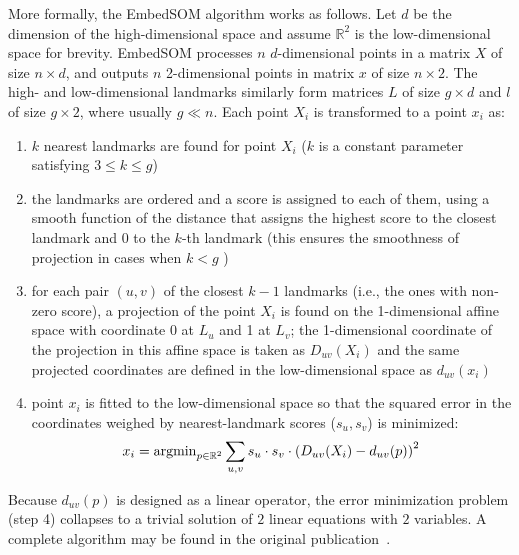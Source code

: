More formally, the EmbedSOM algorithm works as follows. Let $d$ be the dimension of the high-dimensional space and assume $\mathbb{R}^2$ is the low-dimensional space for brevity. EmbedSOM processes $n$ $d$-dimensional points in a matrix $X$ of size $n\times d$, and outputs $n$ 2-dimensional points in matrix $x$ of size $n\times 2$.
The high- and low-dimensional landmarks similarly form matrices $L$ of size $g\times d$ and $l$ of size $g\times 2$, where usually $g\ll n$.
Each point $X_i$ is transformed to a point $x_i$ as:
\begin{enumerate}
\item $k$ nearest landmarks are found for point $X_i$ ($k$ is a constant parameter satisfying $3\leq k\leq g$)
\item the landmarks are ordered and a score is assigned to each of them, using a smooth function of the distance that assigns the highest score to the closest landmark and $0$ to the $k$-th landmark (this ensures the smoothness of projection in cases when $k<g$ \cite{kratochvil2019generalized})
\item for each pair $(u,v)$ of the closest $k-1$ landmarks (i.e., the ones with non-zero score), a projection of the point $X_i$ is found on the 1-dimensional affine space with coordinate 0 at $L_u$ and 1 at $L_v$; the 1-dimensional coordinate of the projection in this affine space is taken as $D_{uv}(X_i)$ and the same projected coordinates are defined in the low-dimensional space as $d_{uv}(x_i)$
\item point $x_i$ is fitted to the low-dimensional space so that the squared error in the coordinates weighed by nearest-landmark scores ($s_u, s_v$) is minimized: $$x_i = \operatorname{argmin}_{p\in \mathbb{R}^2} \sum_{u,v}s_u\cdot s_v\cdot \left(D_{uv}(X_i)-d_{uv}(p)\right)^2$$
\end{enumerate}

Because $d_{uv}(p)$ is designed as a linear operator, the error minimization problem (step 4) collapses to a trivial solution of $2$ linear equations with $2$ variables.
A complete algorithm may be found in the original publication~\cite[Algorithm 1]{kratochvil2019generalized}.


